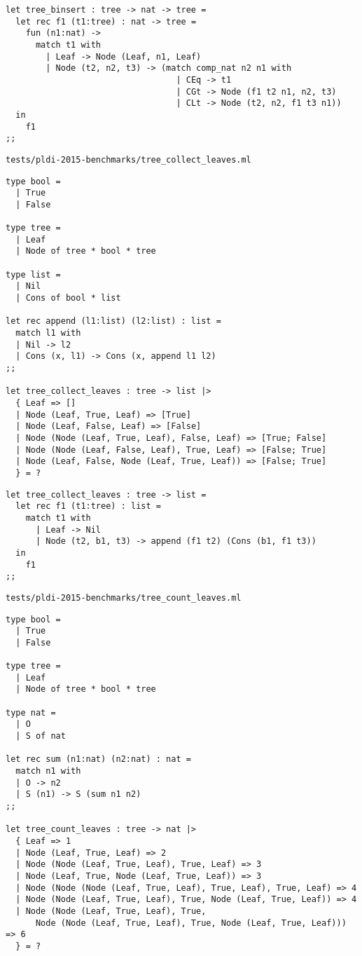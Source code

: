 \begin{verbatim}
let tree_binsert : tree -> nat -> tree =
  let rec f1 (t1:tree) : nat -> tree =
    fun (n1:nat) ->
      match t1 with
        | Leaf -> Node (Leaf, n1, Leaf)
        | Node (t2, n2, t3) -> (match comp_nat n2 n1 with
                                  | CEq -> t1
                                  | CGt -> Node (f1 t2 n1, n2, t3)
                                  | CLt -> Node (t2, n2, f1 t3 n1))
  in
    f1
;;
\end{verbatim}

\noindent\large\texttt{tests/pldi-2015-benchmarks/tree\_collect\_leaves.ml}
\begin{verbatim}
type bool =
  | True
  | False

type tree =
  | Leaf
  | Node of tree * bool * tree

type list =
  | Nil
  | Cons of bool * list

let rec append (l1:list) (l2:list) : list =
  match l1 with
  | Nil -> l2
  | Cons (x, l1) -> Cons (x, append l1 l2)
;;

let tree_collect_leaves : tree -> list |>
  { Leaf => []
  | Node (Leaf, True, Leaf) => [True]
  | Node (Leaf, False, Leaf) => [False]
  | Node (Node (Leaf, True, Leaf), False, Leaf) => [True; False]
  | Node (Node (Leaf, False, Leaf), True, Leaf) => [False; True]
  | Node (Leaf, False, Node (Leaf, True, Leaf)) => [False; True]
  } = ?
\end{verbatim}

\begin{verbatim}
let tree_collect_leaves : tree -> list =
  let rec f1 (t1:tree) : list =
    match t1 with
      | Leaf -> Nil
      | Node (t2, b1, t3) -> append (f1 t2) (Cons (b1, f1 t3))
  in
    f1
;;
\end{verbatim}

\noindent\large\texttt{tests/pldi-2015-benchmarks/tree\_count\_leaves.ml}
\begin{verbatim}
type bool =
  | True
  | False

type tree =
  | Leaf
  | Node of tree * bool * tree

type nat =
  | O
  | S of nat

let rec sum (n1:nat) (n2:nat) : nat =
  match n1 with
  | O -> n2
  | S (n1) -> S (sum n1 n2)
;;

let tree_count_leaves : tree -> nat |>
  { Leaf => 1
  | Node (Leaf, True, Leaf) => 2
  | Node (Node (Leaf, True, Leaf), True, Leaf) => 3
  | Node (Leaf, True, Node (Leaf, True, Leaf)) => 3
  | Node (Node (Node (Leaf, True, Leaf), True, Leaf), True, Leaf) => 4
  | Node (Node (Leaf, True, Leaf), True, Node (Leaf, True, Leaf)) => 4
  | Node (Node (Leaf, True, Leaf), True,
      Node (Node (Leaf, True, Leaf), True, Node (Leaf, True, Leaf))) => 6
  } = ?
\end{verbatim}

